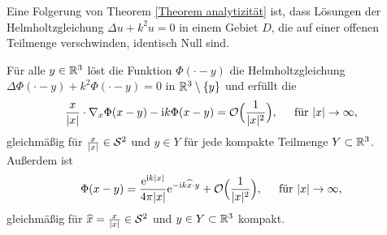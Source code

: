 Eine Folgerung von Theorem \ref{Theorem analytizität} ist, dass Lösungen der Helmholtzgleichung \(\Delta u+k^2u=0\) in einem Gebiet \(D\), die auf einer offenen Teilmenge verschwinden, identisch Null sind.
\begin{lem}\label{lem: fundamentallsg löst HG}
	Für alle \(y\in\mathbb{R}^3\) löst die Funktion \(\Phi(\cdot-y)\) die Helmholtzgleichung \(\Delta \Phi(\cdot -y)+k^2\Phi(\cdot -y)=0\) in \(\mathbb{R}^3\setminus\{y\}\) und erfüllt die \SAB
	\begin{equation}
		\label{SAB in lemma in kapitel 2}
		\frac{x}{|x|}\cdot\nabla_x\Phi(x-y)-\mathrm{i} k\Phi(x-y)=\mathcal{O}\Big(\frac{1}{|x|^2}\Big),\;\;\;\;\text{ für }|x|\rightarrow\infty,
	\end{equation}
	gleichmäßig für \(\frac{x}{|x|}\in\mathcal{S}^2\) und \(y\in Y\) für jede kompakte Teilmenge \(Y\subset\mathbb{R}^3\). Außerdem ist
	\begin{equation}
		\label{lemma zur SAB in kapitel 2}
		\Phi(x-y)=\frac{\mathrm{e}^{\mathrm{i} k|x|}}{4\pi|x|}\mathrm{e}^{-\mathrm{i} k\widehat{x}\cdot y}+\mathcal{O}\Big(\frac{1}{|x|^2}\Big),\;\;\;\;\text{ für }|x|\rightarrow\infty,
	\end{equation}
	gleichmäßig für \(\widehat{x}=\frac{x}{|x|}\in\mathcal{S}^2\) und \(y\in Y\subset \mathbb{R}^3\) kompakt.
\end{lem}
